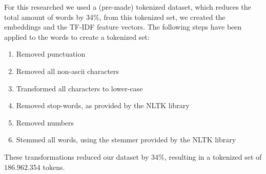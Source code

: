 \documentclass[../../Thesis.tex]{subfiles}
\begin{document}
For this researched we used a (pre-made) tokenized dataset, which reduces the total amount of words by 34\%, from this tokenized set, we created the embeddings and the TF-IDF feature vectors.
The following steps have been applied to the words to create a tokenized set:
\begin{enumerate}
\item{Removed punctuation}
\item{Removed all non-ascii characters}
\item{Transformed all characters to lower-case}
\item{Removed stop-words, as provided by the NLTK library}
\item{Removed numbers}
\item{Stemmed all words, using the stemmer provided by the NLTK library}
\end{enumerate}
These transformations reduced our dataset by 34\%, resulting in a tokenized set of $186.962.354$ tokens.
\end{document}

